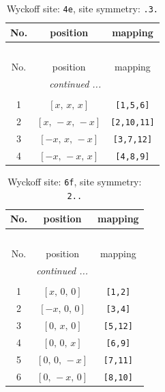 \documentclass[fleqn,8pt]{jsarticle}
\begin{document}
\begin{longtable}{ccc}
\caption{Wyckoff site: {\tt 4e}, site symmetry: {\tt .3.}}
 \\
 \hline \hline
No. & position & mapping \\ \hline \endfirsthead

\multicolumn{2}{l}{\tablename\ \thetable{}} \\
 \hline \hline
No. & position & mapping \\ \hline \endhead

 \hline \hline
\multicolumn{2}{r}{\footnotesize\it continued ...} \\ \endfoot

 \hline \hline
\multicolumn{2}{r}{} \\ \endlastfoot

1 & $\left[ x,\, x,\, x \right]$ & {\tt [1,5,6]} \\ \hline
2 & $\left[ x,\, - x,\, - x \right]$ & {\tt [2,10,11]} \\ \hline
3 & $\left[ - x,\, x,\, - x \right]$ & {\tt [3,7,12]} \\ \hline
4 & $\left[ - x,\, - x,\, x \right]$ & {\tt [4,8,9]} \\
\end{longtable}
\renewcommand{\arraystretch}{1.2}
\begin{longtable}{ccc}
\caption{Wyckoff site: {\tt 6f}, site symmetry: {\tt 2..}}
 \\
 \hline \hline
No. & position & mapping \\ \hline \endfirsthead

\multicolumn{2}{l}{\tablename\ \thetable{}} \\
 \hline \hline
No. & position & mapping \\ \hline \endhead

 \hline \hline
\multicolumn{2}{r}{\footnotesize\it continued ...} \\ \endfoot

 \hline \hline
\multicolumn{2}{r}{} \\ \endlastfoot

1 & $\left[ x,\, 0,\, 0 \right]$ & {\tt [1,2]} \\ \hline
2 & $\left[ - x,\, 0,\, 0 \right]$ & {\tt [3,4]} \\ \hline
3 & $\left[ 0,\, x,\, 0 \right]$ & {\tt [5,12]} \\ \hline
4 & $\left[ 0,\, 0,\, x \right]$ & {\tt [6,9]} \\ \hline
5 & $\left[ 0,\, 0,\, - x \right]$ & {\tt [7,11]} \\ \hline
6 & $\left[ 0,\, - x,\, 0 \right]$ & {\tt [8,10]} \\
\end{longtable}
\end{document}
